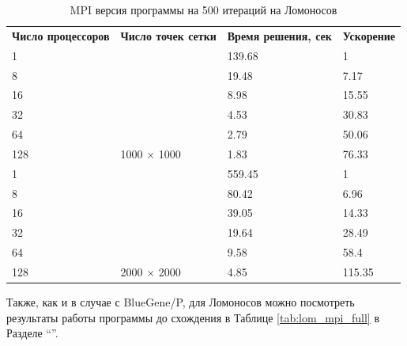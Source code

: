 \documentclass[12pt, a4paper]{article}
\begin{document}
        \begin{table}[H]
            \centering
            \caption{MPI версия программы на 500 итераций на Ломоносов}
            \label{tab:lom_mpi500}
            \begin{tabular}{llll}
            \rowcolor[HTML]{C0C0C0}
            \textbf{Число процессоров} & \textbf{Число точек сетки}                   & \textbf{Время решения, сек} & \textbf{Ускорение} \\
            \rowcolor[HTML]{EFEFEF}
            1                 &                                      & 139.68             & 1         \\
            8                 &                                      & 19.48              & 7.17      \\
            16                &                                      & 8.98               & 15.55     \\
            32                &                                      & 4.53               & 30.83     \\
            64                &                                      & 2.79               & 50.06     \\
            128               & \multirow{-5}{*}{1000 $\times$ 1000} & 1.83               & 76.33     \\
            \rowcolor[HTML]{EFEFEF}
            1                 &                                      & 559.45             & 1         \\
            8                 &                                      & 80.42              & 6.96      \\
            16                &                                      & 39.05              & 14.33     \\
            32                &                                      & 19.64              & 28.49     \\
            64                &                                      & 9.58               & 58.4      \\
            128               & \multirow{-5}{*}{2000 $\times$ 2000} & 4.85               & 115.35
            \end{tabular}
        \end{table}

        Также, как и в случае с BlueGene/P, для Ломоносов можно посмотреть результаты работы программы до схождения в Таблице \ref{tab:lom_mpi_full} в Разделе ``''.
\end{document}
